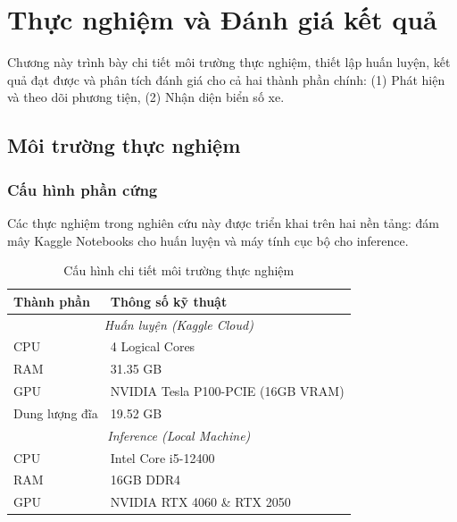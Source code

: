 ﻿\chapter{Thực nghiệm và Đánh giá kết quả}
\label{ch:thucnghiem}

Chương này trình bày chi tiết môi trường thực nghiệm, thiết lập huấn luyện, kết quả đạt được và phân tích đánh giá cho cả hai thành phần chính: (1) Phát hiện và theo dõi phương tiện, (2) Nhận diện biển số xe.

\section{Môi trường thực nghiệm}

\subsection{Cấu hình phần cứng}

Các thực nghiệm trong nghiên cứu này được triển khai trên hai nền tảng: đám mây Kaggle Notebooks cho huấn luyện và máy tính cục bộ cho inference.

\begin{table}[ht!]
    \centering
    \caption{Cấu hình chi tiết môi trường thực nghiệm}
    \label{tab:system_config}
    \begin{tabular}{|l|l|}
        \hline
        \textbf{Thành phần} & \textbf{Thông số kỹ thuật} \\ \hline
        \multicolumn{2}{|c|}{\textit{Huấn luyện (Kaggle Cloud)}} \\ \hline
        CPU & 4 Logical Cores \\ \hline
        RAM & 31.35 GB \\ \hline
        GPU & NVIDIA Tesla P100-PCIE (16GB VRAM) \\ \hline
        Dung lượng đĩa & 19.52 GB \\ \hline
        \multicolumn{2}{|c|}{\textit{Inference (Local Machine)}} \\ \hline
        CPU & Intel Core i5-12400 \\ \hline
        RAM & 16GB DDR4 \\ \hline
        GPU & NVIDIA RTX 4060 \& RTX 2050 \\ \hline
    \end{tabular}
\end{table}

